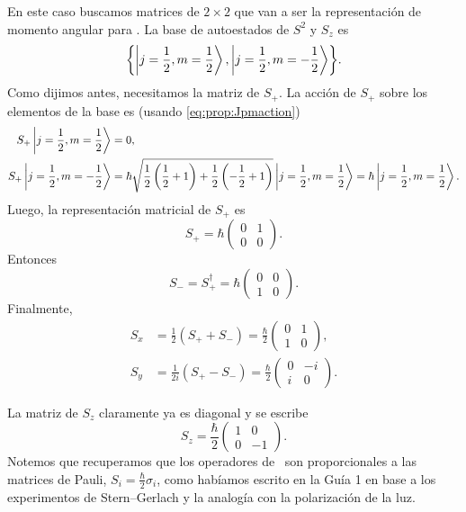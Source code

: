 \documentclass[10pt, a4paper]{article}
\numberwithin{equation}{subsection}
\begin{document}
En este caso buscamos matrices de $2\times2$ que van a ser la representación de
momento angular para \spinhalf. La base de autoestados de $S^2$ y $S_z$ es
\begin{equation}
  \set{\ketjm{\frac{1}{2}}{\frac{1}{2}}, \ketjm{\frac{1}{2}}{-\frac{1}{2}}}.
\end{equation}
Como dijimos antes, necesitamos la matriz de $S_+$. La acción de $S_+$ sobre
los elementos de la base es (usando \eqref{eq:prop:Jpmaction})
\begin{align}
  S_+ \ket{j = {\frac{1}{2}}, m = {\frac{1}{2}}} &= 0, \\
  S_+ \ket{j = {\frac{1}{2}}, m = {-\frac{1}{2}}} &=
    \hbar\sqrt{\frac{1}{2}\left(\frac{1}{2} + 1\right) +
    \frac{1}{2}\left(-\frac{1}{2} + 1\right)}\ket{j = {\frac{1}{2}}, m = {\frac{1}{2}}}
    = \hbar\ket{j = {\frac{1}{2}}, m = {\frac{1}{2}}}.
\end{align}
Luego, la representación matricial de $S_+$ es
\begin{equation}
  S_+ = \hbar\begin{pmatrix} 0 & 1 \\ 0 & 0 \end{pmatrix}.
\end{equation}
Entonces
\begin{equation}
  S_- = S_+^\dagger = \hbar\begin{pmatrix} 0 & 0 \\ 1 & 0 \end{pmatrix}.
\end{equation}
Finalmente,
\begin{align}
  S_x &= \frac{1}{2}\left(S_+ + S_-\right) =
    \frac{\hbar}{2}\begin{pmatrix} 0 & 1 \\ 1 & 0 \end{pmatrix}, \\
  S_y &= \frac{1}{2i}\left(S_+ - S_-\right) =
    \frac{\hbar}{2}\begin{pmatrix} 0 & -i \\ i & 0 \end{pmatrix}.
\end{align}

La matriz de $S_z$ claramente ya es diagonal y se escribe
\begin{equation}
  S_z = \frac{\hbar}{2}\begin{pmatrix} 1 & 0 \\ 0 & -1 \end{pmatrix}.
\end{equation}
Notemos que recuperamos que los operadores de \spinhalf~son proporcionales a
las matrices de Pauli, $S_i = \frac{\hbar}{2}\sigma_i$, como habíamos escrito
en la Guía 1 en base a los experimentos de Stern--Gerlach y la analogía con la
polarización de la luz.
\end{document}
